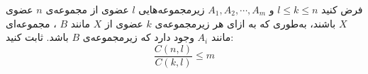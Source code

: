 \EXERCISE
فرض کنید
$l \leq k \leq n$
و
$A_1, A_2, \cdots, A_m$
زیرمجموعه‌هایی
$l$
عضوی از مجموعه‌ی
$n$
عضوی
$X$
باشند، به‌طوری که به ازای هر زیرمجموعه‌ی
$k$
عضوی از
$X$
مانند
$B$
، مجموعه‌ای مانند
$A_i$
وجود دارد که زیرمجموعه‌ی
$B$
باشد. ثابت کنید:
$$\frac{C(n, l)}{C(k, l)} \leq m$$